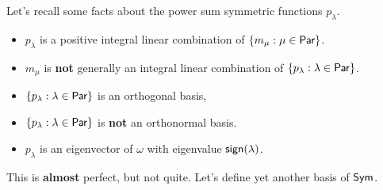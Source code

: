 Let's recall some facts about the power sum symmetric functions \(p_\lambda\).
\begin{itemize}
	\item \(p_\lambda\) is a positive integral linear combination of \(\{m_\mu : \mu \in \operatorname{\mathsf{Par}}\}\).
	\item \(m_\mu\) is \textbf{not} generally an integral linear combination of \(\{p_\lambda : \lambda \in \operatorname{\mathsf{Par}}\}\).
	\item \(\{p_\lambda : \lambda \in \operatorname{\mathsf{Par}}\}\) is an orthogonal basis,
	\item \(\{p_\lambda : \lambda \in \operatorname{\mathsf{Par}}\}\) is \textbf{not} an orthonormal basis.
	\item \(p_\lambda\) is an eigenvector of \(\omega\) with eigenvalue \(\operatorname{\mathsf{sign}}(\lambda)\).
\end{itemize}

This is \textbf{almost} perfect, but not quite.
Let's define yet another basis of \(\operatorname{\mathsf{Sym}}\).